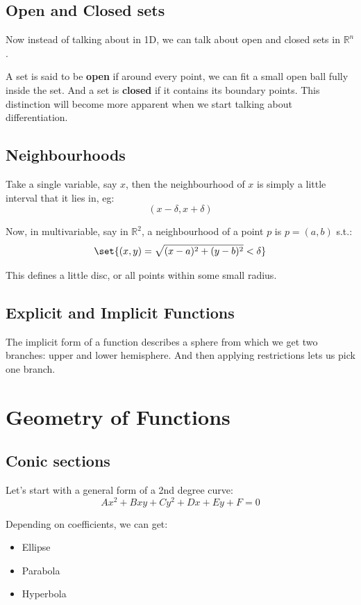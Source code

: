 \section{Open and Closed sets}

Now instead of talking about in 1D, we can talk about open and closed sets in $\mathbb{R}^n$. 

A set is said to be \textbf{open} if around every point, we can fit a small open ball fully inside the set. And a set is \textbf{closed} if it contains its boundary points. This distinction will become more apparent when we start talking about differentiation.

\section{Neighbourhoods}

Take a single variable, say $x$, then the neighbourhood of $x$ is simply a little interval that it lies in, eg: 
$$
(x-\delta, x+\delta)
$$

Now, in multivariable, say in $\mathbb{R}^2$, a neighbourhood of a point $p$ is $p=(a,b)$ s.t.: 
$$
\set{(x,y) = \sqrt{(x-a)^2 + (y-b)^2} < \delta}
$$

This defines a little disc, or all points within some small radius. 

\section{Explicit and Implicit Functions}

The implicit form of a function describes a sphere from which we get two branches: upper and lower hemisphere. And then applying restrictions lets us pick one branch. 

\chapter{Geometry of Functions}

\section{Conic sections}

Let's start with a general form of a 2nd degree curve: 
$$
Ax^2 + Bxy + Cy^2 + Dx + Ey + F = 0
$$

Depending on coefficients, we can get: 
\begin{itemize}
    \item Ellipse 
    \item Parabola 
    \item Hyperbola
\end{itemize}

